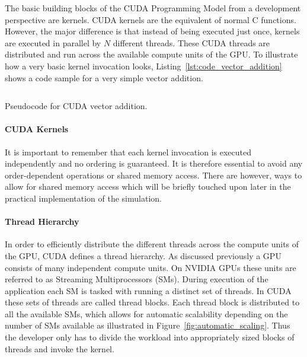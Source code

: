 The basic building blocks of the CUDA Programming Model from a development perspective are kernels. CUDA kernels are the equivalent of normal C functions. However, the major difference is that instead of being executed just once, kernels are executed in parallel by $N$ different threads. These CUDA threads are distributed and run across the available compute units of the GPU. To illustrate how a very basic kernel invocation looks, Listing~\ref{lst:code_vector_addition} shows a code sample for a very simple vector addition.

\begin{listing}[!htbp]
  \centering
  \inputminted[mathescape,
    linenos,
    numbersep=5pt,
    fontsize=\footnotesize,
    frame=lines,
    framesep=2mm]{c}{lst/cuda_vector_add.lst}
  \caption{Pseudocode for CUDA vector addition.}
  \label{lst:code_vector_addition}
\end{listing}

\paragraph{CUDA Kernels}

It is important to remember that each kernel invocation is executed independently and no ordering is guaranteed. It is therefore essential to avoid any order-dependent operations or shared memory access. There are however, ways to allow for shared memory access which will be briefly touched upon later in the practical implementation of the simulation.

\paragraph{Thread Hierarchy}

In order to efficiently distribute the different threads across the compute units of the GPU, CUDA defines a thread hierarchy. As discussed previously a GPU consists of many independent compute units. On NVIDIA GPUs these units are referred to as Streaming Multiprocessors (SMs). During execution of the application each SM is tasked with running a distinct set of threads. In CUDA these sets of threads are called thread blocks. Each thread block is distributed to all the available SMs, which allows for automatic scalability depending on the number of SMs available  as illustrated in Figure~\ref{fig:automatic_scaling}. Thus the developer only has to divide the workload into appropriately sized blocks of threads and invoke the kernel.

